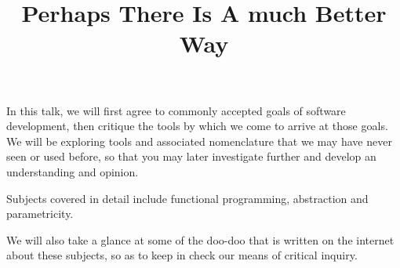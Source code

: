 \title{Perhaps There Is A \tiny{much} Better Way}

In this talk, we will first agree to commonly accepted goals of software
development, then critique the tools by which we come to arrive at those goals.
We will be exploring tools and associated nomenclature that we may have never
seen or used before, so that you may later investigate further and develop an
understanding and opinion.

Subjects covered in detail include functional programming, abstraction and
parametricity.

We will also take a glance at some of the doo-doo that is written on the
internet about these subjects, so as to keep in check our means of critical
inquiry.
